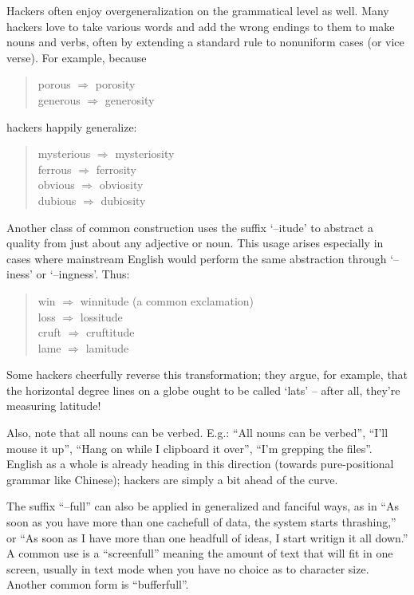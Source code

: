 	Hackers often enjoy overgeneralization on the grammatical level as well. Many hackers love to take various words and add the wrong
	endings to them to make nouns and verbs, often by extending a standard rule to nonuniform cases (or vice verse). For example, because

	\begin{quote}
		porous $\Rightarrow$ porosity\\
		generous $\Rightarrow$ generosity
	\end{quote}

	hackers happily generalize:

	\begin{quote}
		mysterious $\Rightarrow$ mysteriosity\\
		ferrous $\Rightarrow$ ferrosity\\
		obvious $\Rightarrow$ obviosity\\
		dubious $\Rightarrow$ dubiosity
	\end{quote}

	Another class of common construction uses the suffix `--itude' to abstract a quality from just about any adjective or noun. This usage
	arises especially in cases where mainstream English would perform the same abstraction through `--iness' or `--ingness'. Thus:

	\begin{quote}
		win $\Rightarrow$ winnitude (a common exclamation)\\
		loss $\Rightarrow$ lossitude\\
		cruft $\Rightarrow$ cruftitude\\
		lame $\Rightarrow$ lamitude
	\end{quote}

	Some hackers cheerfully reverse this transformation; they argue, for example, that the horizontal degree lines on a globe ought to be
	called `lats' -- after all, they're measuring latitude!

	Also, note that all nouns can be verbed. E.g.: ``All nouns can be verbed'', ``I'll mouse it up'',  ``Hang on while I clipboard it
	over'', ``I'm grepping the files''. English as a whole is already heading in this direction (towards pure-positional grammar like
	Chinese); hackers are simply a bit ahead of the curve.

	The suffix ``--full'' can also be applied in generalized and fanciful ways, as in ``As soon as you have more than one cachefull of
	data, the system starts thrashing,'' or ``As soon as I have more than one headfull of ideas, I start writign it all down.'' A common
	use is a ``screenfull'' meaning the amount of text that will fit in one screen, usually in text mode when you have no choice as to
	character size. Another common form is ``bufferfull''.

